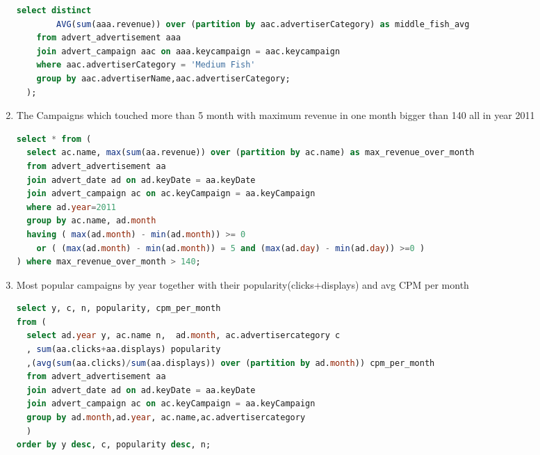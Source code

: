 \begin{enumerate}
\begin{lstlisting}[language=sql]
    select distinct
        AVG(sum(aaa.revenue)) over (partition by aac.advertiserCategory) as middle_fish_avg
    from advert_advertisement aaa 
    join advert_campaign aac on aaa.keycampaign = aac.keycampaign
    where aac.advertiserCategory = 'Medium Fish'   
    group by aac.advertiserName,aac.advertiserCategory;
  );      
  \end{lstlisting}
\item    The Campaigns which touched more than 5 month with maximum revenue in one month bigger than 140 all in year 2011 
  \begin{lstlisting}[language=sql] 
select * from (
  select ac.name, max(sum(aa.revenue)) over (partition by ac.name) as max_revenue_over_month
  from advert_advertisement aa
  join advert_date ad on ad.keyDate = aa.keyDate
  join advert_campaign ac on ac.keyCampaign = aa.keyCampaign
  where ad.year=2011
  group by ac.name, ad.month
  having ( max(ad.month) - min(ad.month)) >= 0 
    or ( (max(ad.month) - min(ad.month)) = 5 and (max(ad.day) - min(ad.day)) >=0 )
) where max_revenue_over_month > 140;
  \end{lstlisting}
\item Most popular campaigns by year together with their popularity(clicks+displays) and  avg CPM per month
  \begin{lstlisting}[language=sql] 
select y, c, n, popularity, cpm_per_month
from (
  select ad.year y, ac.name n,  ad.month, ac.advertisercategory c
  , sum(aa.clicks+aa.displays) popularity
  ,(avg(sum(aa.clicks)/sum(aa.displays)) over (partition by ad.month)) cpm_per_month 
  from advert_advertisement aa
  join advert_date ad on ad.keyDate = aa.keyDate
  join advert_campaign ac on ac.keyCampaign = aa.keyCampaign
  group by ad.month,ad.year, ac.name,ac.advertisercategory
  )
order by y desc, c, popularity desc, n;

  \end{lstlisting}
\end{enumerate}

